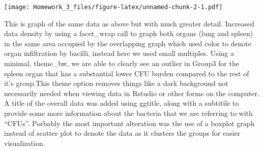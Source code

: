 \documentclass[]{article}
\begin{document}
\texttt{[image: Homework\_3\_files/figure-latex/unnamed-chunk-2-1.pdf]}

This is graph of the same data as above but with much greater detail.
Increased data density by using a facet\_wrap call to graph both organs
(lung and spleen) in the same area occupied by the overlapping graph
which used color to denote organ infiltration by bacilli, instead here
we used small multiples. Using a minimal, theme\_bw, we are able to
clearly see an outlier in Group3 for the spleen organ that has a
substantial lower CFU burden compared to the rest of it's group.This
theme option removes things like a dark background not necessarily
needed when viewing data in Rstudio or other forms on the computer. A
title of the overall data was added using ggtitle, along with a
subtitile to provide some more information about the bacteria that we
are referring to with ``CFUs''. Porbably the most important alteration
was the use of a boxplot graph instead of scatter plot to denote the
data as it clusters the groups for easier visualization.
\end{document}

